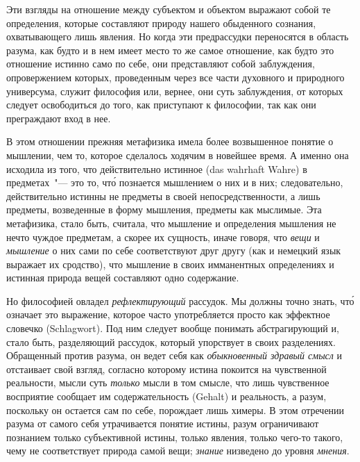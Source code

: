 Эти взгляды на отношение между субъектом и объектом
выражают собой те определения, которые составляют
природу нашего обыденного сознания, охватывающего
лишь явления. Но когда эти предрассудки переносятся
в область разума, как будто и в нем имеет место то же
самое отношение, как будто это отношение истинно само
по себе, они представляют собой заблуждения, опровержением
которых, проведенным через все части духовного
и природного универсума, служит философия или, вернее,
они суть заблуждения, от которых следует освободиться
до того, как приступают к философии, так как они преграждают
вход в нее.

В этом отношении прежняя метафизика имела более
возвышенное понятие о мышлении, чем то, которое сделалось
ходячим в новейшее время. А именно она исходила
из того, что действительно истинное (das wahrhaft
Wahre) в предметах~"--- это то, чт\'о познается мышлением
о них и в них; следовательно, действительно истинны
не предметы в своей непосредственности, а лишь предметы,
возведенные в форму мышления, предметы как
мыслимые. Эта метафизика, стало быть, считала, что
мышление и определения мышления не нечто чуждое
предметам, а скорее их сущность, иначе говоря, что \emph{вещи}
и \emph{мышление} о них сами по себе соответствуют друг
другу (как и немецкий язык выражает их сродство)\endnotemark{},
что мышление в своих имманентных определениях и
истинная природа вещей составляют одно содержание.


Но философией овладел \emph{рефлектирующий} рассудок.
Мы должны точно знать, чт\'о означает это выражение,
которое часто употребляется просто как эффектное
словечко (Schlagwort). Под ним следует вообще понимать
абстрагирующий и, стало быть, разделяющий рассудок,
который упорствует в своих разделениях. Обращенный
против разума, он ведет себя как \emph{обыкновенный здравый
смысл} и отстаивает свой взгляд, согласно которому истина
покоится на чувственной реальности, мысли суть
\emph{только} мысли в том смысле, что лишь чувственное восприятие
сообщает им содержательность (Gehalt) и реальность,
а разум, поскольку он остается сам по себе,
порождает лишь химеры\endnotemark{}. В этом отречении разума от
самого себя утрачивается понятие истины, разум ограничивают
познанием только субъективной истины, только
явления, только чего-то такого, чему не соответствует
природа самой вещи; \emph{знание} низведено до уровня \emph{мнения}.

